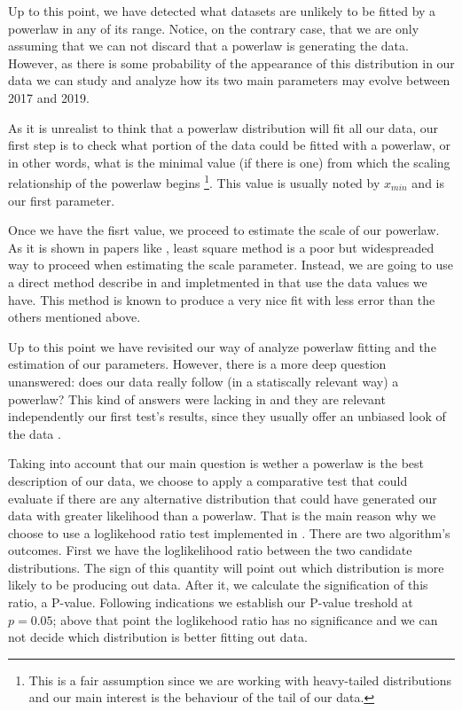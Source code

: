 \documentclass[conference]{IEEEtran}
\begin{document}
Up to this point, we have detected what datasets are unlikely to be fitted by a powerlaw
in any of its range. Notice, on the contrary case, that we are only assuming that
we can not discard that a powerlaw is generating the data.
However, as there is some probability of the appearance of this distribution in our data
we can study and analyze how its two main parameters may evolve between 2017 and 2019.

As it is unrealist to think that a powerlaw distribution will
fit all our data, our first step is to check what portion of the data
could be fitted with a powerlaw, or in other words, what is the minimal value 
(if there is one) from which the scaling relationship of the powerlaw begins
\footnote{This is a fair assumption since we are working with heavy-tailed distributions 
	and our main interest is the behaviour of the tail of our data.}. 
This value is usually noted by $x_{min}$ and is our first parameter.

Once we have the fisrt value, we proceed to estimate the scale of our powerlaw.
As it is shown in papers like \cite{newman2005power, clauset2009power},
least square method is a poor but widespreaded way to proceed when estimating the
scale parameter. Instead, we are going to use a direct method describe in
\cite{clauset2009power} and impletmented in \cite{alstott2014powerlaw} that use
the data values we have. This method is known to produce a very nice fit with
less error than the others mentioned above.

Up to this point we have revisited our way of analyze powerlaw fitting and
the estimation of our parameters. However, there is a more deep question unanswered:
does our data really follow (in a statiscally relevant way) a powerlaw?
This kind of answers were lacking in \cite{merelo2017self} and they are relevant
independently our first test's results, since they usually offer an unbiased look of the data . 

Taking into account that our main question is wether a powerlaw is the best 
description of our data, we choose to apply a comparative test that could 
evaluate if there are any alternative distribution that could have generated
our data with greater likelihood than a powerlaw. That is the main reason why
we choose to use a loglikehood ratio test implemented in \cite{alstott2014powerlaw}.
There are two algorithm's outcomes. First we have the loglikelihood ratio between the 
two  candidate  distributions. The sign of this quantity will point out which
distribution is more likely to be producing out data. After it, we calculate the signification 
of this ratio, a P-value. Following \cite{alstott2014powerlaw} indications we establish our P-value treshold at $p=0.05$;
above that point the loglikehood ratio has no significance and we can not decide which distribution
is better fitting out data.
\end{document}
